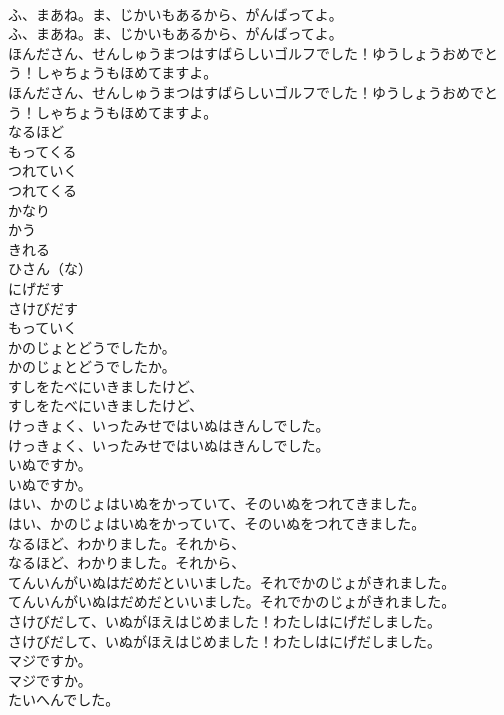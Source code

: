 \documentclass[8pt]{extreport}
\begin{document}
\begin{CJK}{UTF8}{min}
\\	ふ、まあね。ま、じかいもあるから、がんばってよ。	
\\	ふ、まあね。ま、じかいもあるから、がんばってよ。 
\\	ほんださん、せんしゅうまつはすばらしいゴルフでした！ゆうしょうおめでとう！しゃちょうもほめてますよ。	
\\	ほんださん、せんしゅうまつはすばらしいゴルフでした！ゆうしょうおめでとう！しゃちょうもほめてますよ。 
\\	なるほど
\\	もってくる
\\	つれていく
\\	つれてくる
\\	かなり
\\	かう
\\	きれる
\\	ひさん（な）
\\	にげだす
\\	さけびだす
\\	もっていく
\\	かのじょとどうでしたか。	
\\	かのじょとどうでしたか。 
\\	すしをたべにいきましたけど、	
\\	すしをたべにいきましたけど、 
\\	けっきょく、いったみせではいぬはきんしでした。	
\\	けっきょく、いったみせではいぬはきんしでした。 
\\	いぬですか。	
\\	いぬですか。 
\\	はい、かのじょはいぬをかっていて、そのいぬをつれてきました。	
\\	はい、かのじょはいぬをかっていて、そのいぬをつれてきました。 
\\	なるほど、わかりました。それから、	
\\	なるほど、わかりました。それから、 
\\	てんいんがいぬはだめだといいました。それでかのじょがきれました。	
\\	てんいんがいぬはだめだといいました。それでかのじょがきれました。 
\\	さけびだして、いぬがほえはじめました！わたしはにげだしました。	
\\	さけびだして、いぬがほえはじめました！わたしはにげだしました。 
\\	マジですか。	
\\	マジですか。 
\\	たいへんでした。	

\end{CJK}
\end{document}
